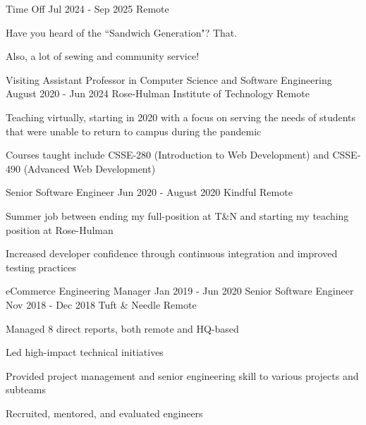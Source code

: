 

\begin{cventries}

  \cventry
  {Time Off}
  {Jul 2024 - Sep 2025}
  {}
  {Remote}
  {
    \begin{cvitems}
      \item Have you heard of the ``Sandwich Generation"? That.
      \item Also, a lot of sewing and community service!
    \end{cvitems}
  }

  \cventry
  {Visiting Assistant Professor in Computer Science and Software Engineering}
  {August 2020 - Jun 2024}
  {Rose-Hulman Institute of Technology}
  {Remote}
  {
    \begin{cvitems}
      \item Teaching virtually, starting in 2020 with a focus on serving the needs of students that were unable to return to campus during the pandemic
      \item Courses taught include CSSE-280 (Introduction to Web Development) and CSSE-490 (Advanced Web Development)
    \end{cvitems}
  }

  \cventry
  {Senior Software Engineer}
  {Jun 2020 - August 2020}
  {Kindful}
  {Remote}
  {
    \begin{cvitems}
      \item Summer job between ending my full-position at T\&N and starting my teaching position at Rose-Hulman
      \item Increased developer confidence through continuous integration and improved testing practices
    \end{cvitems}
  }

  \doublecventry
  {eCommerce Engineering Manager}
  {Jan 2019 - Jun 2020}
  {Senior Software Engineer}
  {Nov 2018 - Dec 2018}
  {Tuft \& Needle}
  {Remote}
  {
    \begin{cvitems}
      \item Managed 8 direct reports, both remote and HQ-based
      \item Led high-impact technical initiatives
      \item Provided project management and senior engineering skill to various projects and subteams
      \item Recruited, mentored, and evaluated engineers
    \end{cvitems}
  }


\end{cventries}
